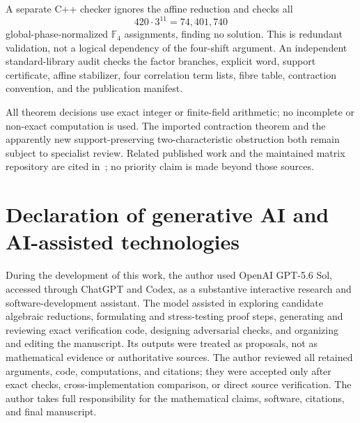 \documentclass[10pt]{article}
\newcommand{\F}{\mathbb F}
\begin{document}
A separate C++ checker ignores the affine reduction and checks all
\[
 420\cdot3^{11}=74{,}401{,}740
\]
global-phase-normalized $\F_4$ assignments, finding no solution.  This is
redundant validation, not a logical dependency of the four-shift argument.
An independent standard-library audit checks the factor branches, explicit
word, support certificate, affine stabilizer, four correlation term lists,
fibre table, contraction convention, and the publication manifest.

All theorem decisions use exact integer or finite-field arithmetic; no
incomplete or non-exact computation is used.  The imported contraction
theorem and the apparently new
support-preserving two-characteristic obstruction both remain subject to
specialist review.  Related published work and the maintained matrix
repository are cited in~\cite{GordonRepository2026,Gordon2026}; no priority
claim is made beyond those sources.

\section*{Declaration of generative AI and AI-assisted technologies}

During the development of this work, the author used OpenAI GPT-5.6 Sol,
accessed through ChatGPT and Codex, as a substantive interactive research and
software-development assistant.  The model assisted in exploring candidate
algebraic reductions, formulating and stress-testing proof steps, generating
and reviewing exact verification code, designing adversarial checks, and
organizing and editing the manuscript.  Its outputs were treated as proposals,
not as mathematical evidence or authoritative sources.  The author reviewed
all retained arguments, code, computations, and citations; they were accepted
only after exact checks, cross-implementation comparison, or direct source
verification.  The author takes full
responsibility for the mathematical claims, software, citations, and final
manuscript.



\end{document}
